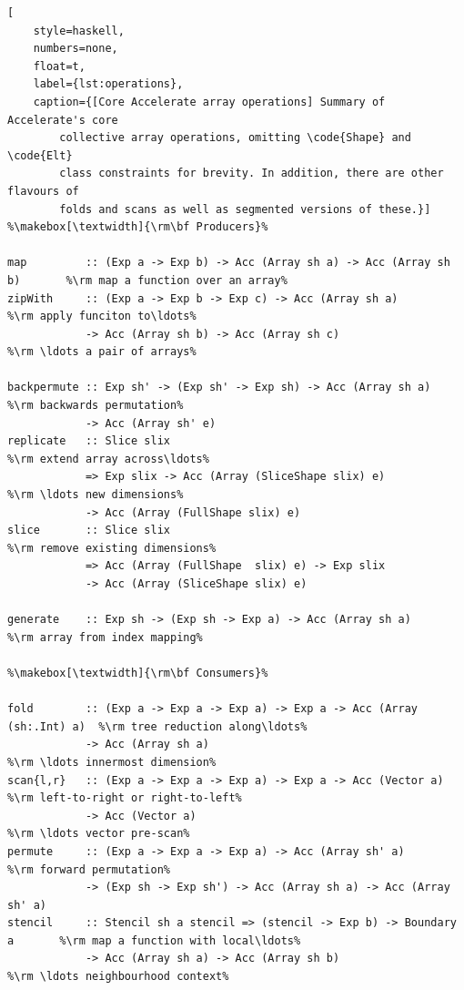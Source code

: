\begin{lstlisting}[
    style=haskell,
    numbers=none,
    float=t,
    label={lst:operations},
    caption={[Core Accelerate array operations] Summary of Accelerate's core
        collective array operations, omitting \code{Shape} and \code{Elt}
        class constraints for brevity. In addition, there are other flavours of
        folds and scans as well as segmented versions of these.}]
%\makebox[\textwidth]{\rm\bf Producers}%

map         :: (Exp a -> Exp b) -> Acc (Array sh a) -> Acc (Array sh b)       %\rm map a function over an array%
zipWith     :: (Exp a -> Exp b -> Exp c) -> Acc (Array sh a)                  %\rm apply funciton to\ldots%
            -> Acc (Array sh b) -> Acc (Array sh c)                           %\rm \ldots a pair of arrays%

backpermute :: Exp sh' -> (Exp sh' -> Exp sh) -> Acc (Array sh a)             %\rm backwards permutation%
            -> Acc (Array sh' e)
replicate   :: Slice slix                                                     %\rm extend array across\ldots%
            => Exp slix -> Acc (Array (SliceShape slix) e)                    %\rm \ldots new dimensions%
            -> Acc (Array (FullShape slix) e)
slice       :: Slice slix                                                     %\rm remove existing dimensions%
            => Acc (Array (FullShape  slix) e) -> Exp slix
            -> Acc (Array (SliceShape slix) e)

generate    :: Exp sh -> (Exp sh -> Exp a) -> Acc (Array sh a)                %\rm array from index mapping%

%\makebox[\textwidth]{\rm\bf Consumers}%

fold        :: (Exp a -> Exp a -> Exp a) -> Exp a -> Acc (Array (sh:.Int) a)  %\rm tree reduction along\ldots%
            -> Acc (Array sh a)                                               %\rm \ldots innermost dimension%
scan{l,r}   :: (Exp a -> Exp a -> Exp a) -> Exp a -> Acc (Vector a)           %\rm left-to-right or right-to-left%
            -> Acc (Vector a)                                                 %\rm \ldots vector pre-scan%
permute     :: (Exp a -> Exp a -> Exp a) -> Acc (Array sh' a)                 %\rm forward permutation%
            -> (Exp sh -> Exp sh') -> Acc (Array sh a) -> Acc (Array sh' a)
stencil     :: Stencil sh a stencil => (stencil -> Exp b) -> Boundary a       %\rm map a function with local\ldots%
            -> Acc (Array sh a) -> Acc (Array sh b)                           %\rm \ldots neighbourhood context%
\end{lstlisting}

